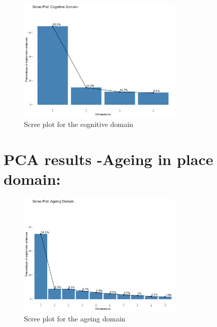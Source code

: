 \documentclass[
  letterpaper,
  DIV=11,
  numbers=noendperiod]{scrartcl}
\begin{document}
\begin{figure}

{\centering \includegraphics[width=0.7\textwidth,height=\textheight]{imgs/scree_plot_cognitive.png}

}

\caption{Scree plot for the cognitive domain}

\end{figure}

\hypertarget{pca-results--ageing-in-place-domain}{%
\section{PCA results -Ageing in place
domain:}\label{pca-results--ageing-in-place-domain}}

\begin{figure}

{\centering \includegraphics[width=0.7\textwidth,height=\textheight]{imgs/scree_plot_ageing.png}

}

\caption{Scree plot for the ageing domain}

\end{figure}
\end{document}
